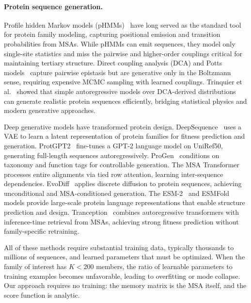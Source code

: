 
\paragraph{Protein sequence generation.}
Profile hidden Markov models (pHMMs)~\cite{hmmer3,kroghHiddenMarkovModels1994} have long served as the standard tool for protein family modeling, capturing positional emission and transition probabilities from MSAs. While pHMMs can emit sequences, they model only single-site statistics and miss the pairwise and higher-order couplings critical for maintaining tertiary structure. Direct coupling analysis (DCA) and Potts models~\cite{morcosDirectCouplingAnalysis2011,ekeberg2013improved} capture pairwise epistasis but are generative only in the Boltzmann sense, requiring expensive MCMC sampling with learned couplings. Trinquier et al.~\cite{trinquierEfficientGenerativeModeling2021} showed that simple autoregressive models over DCA-derived distributions can generate realistic protein sequences efficiently, bridging statistical physics and modern generative approaches.

Deep generative models have transformed protein design. DeepSequence~\cite{riesselman2018deep} uses a VAE to learn a latent representation of protein families for fitness prediction and generation. ProtGPT2~\cite{ferruzProtGPT2DeepUnsupervised2022} fine-tunes a GPT-2 language model on UniRef50, generating full-length sequences autoregressively. ProGen~\cite{madaniProGenLanguageModeling2023} conditions on taxonomy and function tags for controllable generation. The MSA Transformer~\cite{raoMSATransformer2021} processes entire alignments via tied row attention, learning inter-sequence dependencies. EvoDiff~\cite{alamdariProteinGeneration2023} applies discrete diffusion to protein sequences, achieving unconditional and MSA-conditioned generation. The ESM-2~\cite{linEvolutionaryScaleModeling2023} and ESMFold models provide large-scale protein language representations that enable structure prediction and design. Tranception~\cite{notinTranception2022} combines autoregressive transformers with inference-time retrieval from MSAs, achieving strong fitness prediction without family-specific retraining.

All of these methods require substantial training data, typically thousands to millions of sequences, and learned parameters that must be optimized. When the family of interest has $K<200$ members, the ratio of learnable parameters to training examples becomes unfavorable, leading to overfitting or mode collapse. Our approach requires no training: the memory matrix is the MSA itself, and the score function is analytic.

